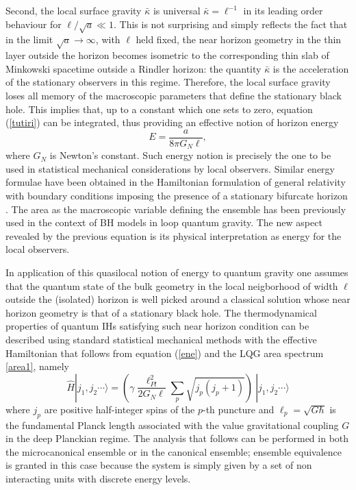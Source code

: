 \documentclass[aps, nofootinbib,superscriptaddress,12pt]{revtex4-2}
\def\be{\begin{equation}}
\def\ee{\end{equation}}
\begin{document}
Second, the local surface gravity $\bar\kappa$ is universal $\bar\kappa=\ell^{-1}$ in its leading order behaviour for $\ell/\sqrt{a}\ll 1$. This is not surprising and simply reflects the fact that in the limit $\sqrt{a}\to \infty$, with $\ell$ held fixed, the near horizon geometry in the thin layer outside the horizon becomes isometric to the corresponding thin slab of Minkowski spacetime outside a Rindler horizon: the quantity $\bar\kappa$ is the acceleration of the stationary observers in this regime. Therefore, the local surface gravity loses all memory of the macroscopic parameters that define the stationary black hole. This implies that, up to a constant which one sets to zero, equation (\ref{tutiri}) can be integrated, thus providing an effective notion of horizon energy 
\be E=\frac{a}{8\pi G_{N}\ell},\label{ene}\ee
where $G_N$ is Newton's constant. 
Such energy notion is precisely the one 
to be used in statistical mechanical considerations by local observers.   
Similar energy formulae have been obtained in the Hamiltonian formulation of general relativity
with boundary conditions imposing the presence of a stationary bifurcate horizon \cite{Carlip:1993sa}.
The area as the macroscopic variable defining the ensemble has been
previously \cite{Krasnov:1997yt} used  in the context of BH models in loop quantum gravity. The new aspect revealed by the previous equation is its physical interpretation as energy for the local observers.

In application of this quasilocal notion of energy to quantum gravity one assumes that the quantum state of the bulk geometry in the local neigborhood of width $\ell$ outside the (isolated) horizon is well picked around a classical solution whose near horizon geometry is that of a stationary black hole.  The thermodynamical properties of quantum IHs satisfying such near horizon condition can be described using standard statistical mechanical
methods with the effective Hamiltonian that follows from equation (\ref{ene}) and the LQG area spectrum \eqref{area1}, namely
\be\label{ham}
\widehat H|j_1,j_2\cdots\rangle=\left(\gamma \frac{\ell^2_{Pl}}{2 G_N\ell}  \sum_{p} \sqrt{j_p (j_p+1)}\right)\  |j_1,j_2\cdots\rangle
\ee
where $j_p$ are positive half-integer spins of the $p$-th puncture and $\ell_p=\sqrt {G\hbar}$ is the fundamental Planck length associated with the value  gravitational coupling $G$ in the deep Planckian regime.
The analysis that follows can be performed in both the microcanonical ensemble or in the canonical ensemble; ensemble equivalence is granted
in this case because the system is simply given by a set of non interacting units with discrete energy levels. 
\end{document}
